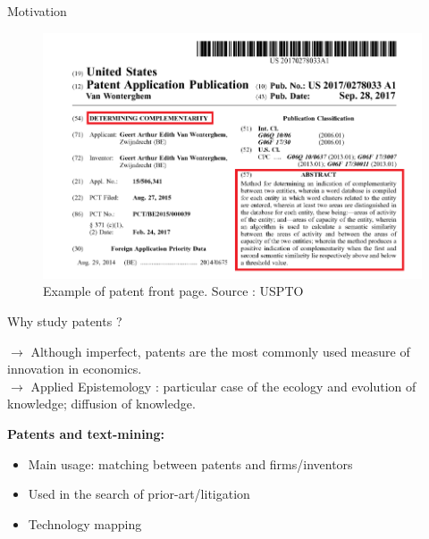 \documentclass{beamer}
\begin{document}
\begin{frame}{Motivation}
    \begin{figure}
        \centering
        \includegraphics[width=0.8\linewidth]{figures/patent_abstract_ex.png}
        \caption{Example of patent front page. Source : USPTO}
    \end{figure}
\end{frame}
\begin{frame}{Why study patents ?}

$\rightarrow$ Although imperfect, patents are the most commonly used measure of innovation in economics. \\ %
$\rightarrow$ Applied Epistemology : particular case of the ecology and evolution of knowledge; diffusion of knowledge.

\bigskip

\textbf{Patents and text-mining: }

    \begin{itemize}
        \item Main usage: matching between patents and firms/inventors
        \item Used in the search of prior-art/litigation
        \item Technology mapping
    \end{itemize}
\end{frame}

%
\end{document}
